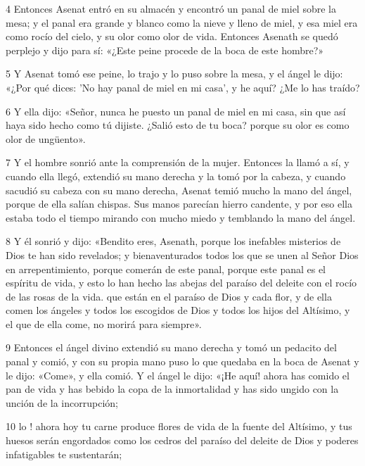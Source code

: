 \par 4 Entonces Asenat entró en su almacén y encontró un panal de miel sobre la mesa; y el panal era grande y blanco como la nieve y lleno de miel, y esa miel era como rocío del cielo, y su olor como olor de vida. Entonces Asenath se quedó perplejo y dijo para sí: «¿Este peine procede de la boca de este hombre?»

\par 5 Y Asenat tomó ese peine, lo trajo y lo puso sobre la mesa, y el ángel le dijo: «¿Por qué dices: 'No hay panal de miel en mi casa', y he aquí? ¿Me lo has traído?

\par 6 Y ella dijo: «Señor, nunca he puesto un panal de miel en mi casa, sin que así haya sido hecho como tú dijiste. ¿Salió esto de tu boca? porque su olor es como olor de ungüento».

\par 7 Y el hombre sonrió ante la comprensión de la mujer. Entonces la llamó a sí, y cuando ella llegó, extendió su mano derecha y la tomó por la cabeza, y cuando sacudió su cabeza con su mano derecha, Asenat temió mucho la mano del ángel, porque de ella salían chispas. Sus manos parecían hierro candente, y por eso ella estaba todo el tiempo mirando con mucho miedo y temblando la mano del ángel.

\par 8 Y él sonrió y dijo: «Bendito eres, Asenath, porque los inefables misterios de Dios te han sido revelados; y bienaventurados todos los que se unen al Señor Dios en arrepentimiento, porque comerán de este panal, porque este panal es el espíritu de vida, y esto lo han hecho las abejas del paraíso del deleite con el rocío de las rosas de la vida. que están en el paraíso de Dios y cada flor, y de ella comen los ángeles y todos los escogidos de Dios y todos los hijos del Altísimo, y el que de ella come, no morirá para siempre».

\par 9 Entonces el ángel divino extendió su mano derecha y tomó un pedacito del panal y comió, y con su propia mano puso lo que quedaba en la boca de Asenat y le dijo: «Come», y ella comió. Y el ángel le dijo: «¡He aquí! ahora has comido el pan de vida y has bebido la copa de la inmortalidad y has sido ungido con la unción de la incorrupción;

\par 10 lo ! ahora hoy tu carne produce flores de vida de la fuente del Altísimo, y tus huesos serán engordados como los cedros del paraíso del deleite de Dios y poderes infatigables te sustentarán;

